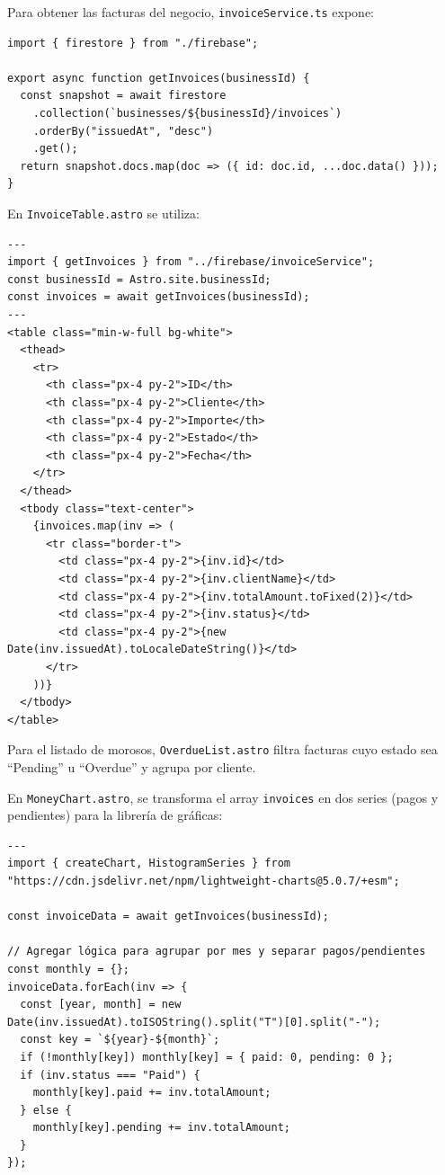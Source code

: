 \begin{large}

Para obtener las facturas del negocio, \texttt{invoiceService.ts} expone:

\begin{verbatim}
import { firestore } from "./firebase";

export async function getInvoices(businessId) {
  const snapshot = await firestore
    .collection(`businesses/${businessId}/invoices`)
    .orderBy("issuedAt", "desc")
    .get();
  return snapshot.docs.map(doc => ({ id: doc.id, ...doc.data() }));
}
\end{verbatim}

En \texttt{InvoiceTable.astro} se utiliza:

\begin{verbatim}
---
import { getInvoices } from "../firebase/invoiceService";
const businessId = Astro.site.businessId;
const invoices = await getInvoices(businessId);
---
<table class="min-w-full bg-white">
  <thead>
    <tr>
      <th class="px-4 py-2">ID</th>
      <th class="px-4 py-2">Cliente</th>
      <th class="px-4 py-2">Importe</th>
      <th class="px-4 py-2">Estado</th>
      <th class="px-4 py-2">Fecha</th>
    </tr>
  </thead>
  <tbody class="text-center">
    {invoices.map(inv => (
      <tr class="border-t">
        <td class="px-4 py-2">{inv.id}</td>
        <td class="px-4 py-2">{inv.clientName}</td>
        <td class="px-4 py-2">{inv.totalAmount.toFixed(2)}</td>
        <td class="px-4 py-2">{inv.status}</td>
        <td class="px-4 py-2">{new Date(inv.issuedAt).toLocaleDateString()}</td>
      </tr>
    ))}
  </tbody>
</table>
\end{verbatim}

Para el listado de morosos, \texttt{OverdueList.astro} filtra facturas cuyo estado sea “Pending” u “Overdue” y agrupa por cliente.

En \texttt{MoneyChart.astro}, se transforma el array \texttt{invoices} en dos series (pagos y pendientes) para la librería de gráficas:

\begin{verbatim}
---
import { createChart, HistogramSeries } from "https://cdn.jsdelivr.net/npm/lightweight-charts@5.0.7/+esm";

const invoiceData = await getInvoices(businessId);

// Agregar lógica para agrupar por mes y separar pagos/pendientes
const monthly = {};
invoiceData.forEach(inv => {
  const [year, month] = new Date(inv.issuedAt).toISOString().split("T")[0].split("-");
  const key = `${year}-${month}`;
  if (!monthly[key]) monthly[key] = { paid: 0, pending: 0 };
  if (inv.status === "Paid") {
    monthly[key].paid += inv.totalAmount;
  } else {
    monthly[key].pending += inv.totalAmount;
  }
});


\end{verbatim}
\end{large}
